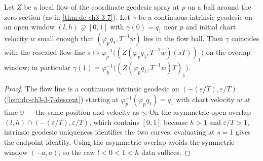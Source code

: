 \begin{lemma}
  \label{lem:dc-ch3-4-2-endpoint-id}
  \leanok
  Let $Z$ be a local flow of the coordinate geodesic spray at $p$ on a ball around the zero section
  (as in \cref{thm:dc-ch3-3-7}). Let $\gamma$ be a continuous intrinsic geodesic on an open window
  $(l,h)\supsetneq[0,1]$ with $\gamma(0)=q_1$ near $p$ and initial chart velocity $w$ small enough that
  $(\varphi_p q_1,T^{-1}w)$ lies in the flow ball. Then $\gamma$ coincides with the rescaled flow line
  $s\mapsto\varphi_p^{-1}\big((Z(\varphi_p q_1,T^{-1}w)(sT))_1\big)$ on the overlap window; in
  particular $\gamma(1)=\varphi_p^{-1}\big((Z(\varphi_p q_1,T^{-1}w)T)_1\big)$.
\end{lemma}
\begin{proof}
  \sketch
  \leanok
  The flow line is a continuous intrinsic geodesic on $(-(\varepsilon/T),\varepsilon/T)$
  (\cref{lem:dc-ch3-3-7-descent}) starting at $\varphi_p^{-1}(\varphi_p q_1)=q_1$ with chart velocity
  $w$ at time $0$ --- the same position and velocity as $\gamma$. On the asymmetric open overlap
  $(l,h)\cap(-(\varepsilon/T),\varepsilon/T)$, which contains $[0,1]$ because $h>1$ and
  $\varepsilon/T>1$, intrinsic geodesic uniqueness identifies the two curves; evaluating at $s=1$ gives
  the endpoint identity. Using the asymmetric overlap avoids the symmetric window $(-a,a)$, so the raw
  $l<0<1<h$ data suffices.
\end{proof}

